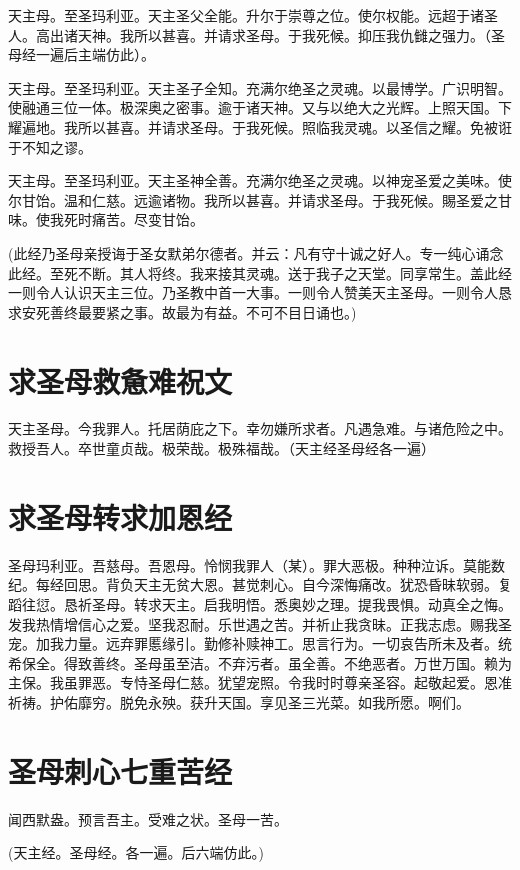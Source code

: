 \documentclass[UTF8,17pt]{ctexart}
\begin{document}
天主母。⾄圣玛利亚。天主圣⽗全能。升尔于崇尊之位。使尔权能。远超于诸圣⼈。⾼出诸天神。我所以甚喜。并请求圣母。于我死候。抑压我仇雠之强⼒。（圣母经⼀遍后主端仿此）。

天主母。⾄圣玛利亚。天主圣⼦全知。充满尔绝圣之灵魂。以最博学。⼴识明智。使融通三位⼀体。极深奥之密事。逾于诸天神。又与以绝⼤之光辉。上照天国。下耀遍地。我所以甚喜。并请求圣母。于我死候。照临我灵魂。以圣信之耀。免被诳于不知之谬。

天主母。⾄圣玛利亚。天主圣神全善。充满尔绝圣之灵魂。以神宠圣爱之美味。使尔⽢饴。温和仁慈。远逾诸物。我所以甚喜。并请求圣母。于我死候。賜圣爱之⽢味。使我死时痛苦。尽变⽢饴。

(此经乃圣母亲授诲于圣⼥默弟尔德者。并云：凡有守⼗诚之好⼈。专⼀纯⼼诵念此经。⾄死不断。其⼈将终。我来接其灵魂。送于我⼦之天堂。同享常⽣。盖此经⼀则令⼈认识天主三位。乃圣教中⾸⼀⼤事。⼀则令⼈赞美天主圣母。⼀则令⼈恳求安死善终最要紧之事。故最为有益。不可不⽬⽇诵也。)

\section{求圣母救惫难祝⽂}

天主圣母。今我罪⼈。托居荫庇之下。幸勿嫌所求者。凡遇急难。与诸危险之中。救授吾⼈。卒世童贞哉。极荣哉。极殊福哉。（天主经圣母经各⼀遍）

\section{求圣母转求加恩经}

圣母玛利亚。吾慈母。吾恩母。怜悯我罪⼈（某）。罪⼤恶极。种种泣诉。莫能数纪。每经回思。背负天主⽆贫⼤恩。甚觉刺⼼。⾃今深悔痛改。犹恐昏昧软弱。复蹈往愆。恳祈圣母。转求天主。启我明悟。悉奥妙之理。提我畏惧。动真全之悔。发我热情增信⼼之爱。坚我忍耐。乐世遇之苦。并祈⽌我贪昧。正我志虑。赐我圣宠。加我⼒量。远弃罪慝缘引。勤修补赎神⼯。思⾔⾏为。⼀切哀告所未及者。统希保全。得致善终。圣母虽⾄洁。不弃污者。虽全善。不绝恶者。万世万国。赖为主保。我虽罪恶。专恃圣母仁慈。犹望宠照。令我时时尊亲圣容。起敬起爱。恩准祈祷。护佑靡穷。脱免永殃。获升天国。享见圣三光菜。如我所愿。啊们。

\section{圣母刺⼼七重苦经}

闻西默盎。预⾔吾主。受难之状。圣母⼀苦。

(天主经。圣母经。各⼀遍。后六端仿此。)
\end{document}
